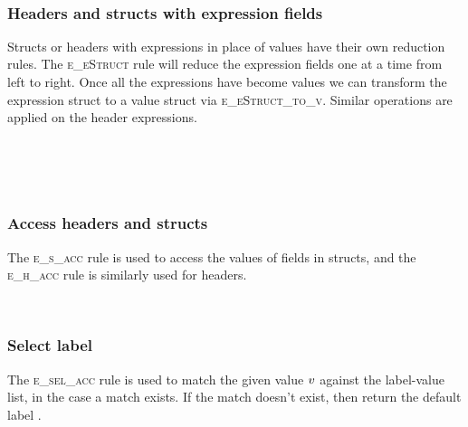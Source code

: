 \documentclass[UTF8]{article}
\begin{document}
\begin{figure}[ht!]
    \ottusedrule{\ottdruleeXXcallXXargs{}} \\
    \ottusedrule{\ottdruleeXXcallXXnewframe{}}
\end{figure}


\subsubsection*{Headers and structs with expression fields}
Structs or headers with expressions in place of values have their own reduction rules. The \textsc{e\_eStruct} rule will reduce the expression fields one at a time from left to right. Once all the expressions have become values we can transform the expression struct to a value struct via \textsc{e\_eStruct\_to\_v}. Similar operations are applied on the header expressions.

\begin{figure}[ht!]
    \ottusedrule{\ottdruleeXXeStruct{}} \\
    \ottusedrule{\ottdruleeXXeStructXXtoXXv{}} \\
    \ottusedrule{\ottdruleeXXeHeader{}} \\
    \ottusedrule{\ottdruleeXXeHeaderXXtoXXv{}}
\end{figure}


\subsubsection*{Access headers and structs}
The \textsc{e\_s\_acc} rule is used to access the values of fields in structs, and the \textsc{e\_h\_acc} rule is similarly used for headers.

\begin{figure}[ht!]
    \ottusedrule{\ottdruleeXXsXXacc{}} \\
    \ottusedrule{\ottdruleeXXhXXacc{}} 
\end{figure}


\subsubsection*{Select label}
The \textsc{e\_sel\_acc} rule is used to match the given value $v$ against the label-value list, in the case a match exists. If the match doesn't exist, then return the default label \vn.

\begin{figure}[ht!]
    \ottusedrule{\ottdruleeXXselXXacc{}}
\end{figure}
\end{document}
